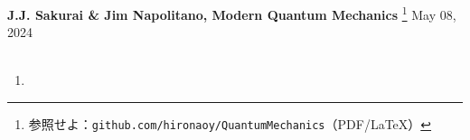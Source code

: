 \documentclass{jarticle}
\begin{document}
\noindent
\textbf{J.J. Sakurai \& Jim Napolitano, Modern Quantum Mechanics}
\footnote{
  参照せよ：\texttt{github.com/hironaoy/QuantumMechanics}（PDF/\LaTeX）
}
\hfill May 08, 2024\vspace{-2mm} \\
\hrulefill \\

\noindent
\begin{enumerate}
\item 
\end{enumerate}
\end{document}
